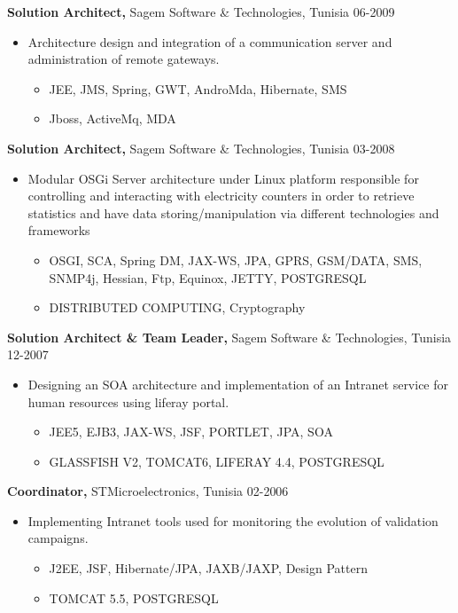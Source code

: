 \documentclass{res}
\begin{document}
\begin{resume}
{\bf Solution Architect,} Sagem Software \& Technologies, Tunisia \hfill   06-2009
\begin{itemize} \itemsep -2pt  %
\item Architecture design and integration of a communication server and administration of remote gateways.
\begin{itemize} \itemsep -2pt  %
\item JEE, JMS, Spring, GWT, AndroMda, Hibernate, SMS
\item Jboss, ActiveMq, MDA
\end{itemize}
\end{itemize}

{\bf Solution Architect,} Sagem Software \& Technologies, Tunisia \hfill   03-2008
\begin{itemize} \itemsep -2pt  %
\item Modular OSGi Server architecture under Linux platform responsible for controlling and interacting with electricity counters in order to retrieve statistics and have data storing/manipulation via different technologies and frameworks
\begin{itemize} \itemsep -2pt  %
\item OSGI, SCA, Spring DM, JAX-WS, JPA, GPRS, GSM/DATA, SMS, SNMP4j, Hessian, Ftp, Equinox, JETTY, POSTGRESQL
\item DISTRIBUTED COMPUTING, Cryptography
\end{itemize}
\end{itemize}


{\bf Solution Architect \& Team Leader,} Sagem Software \& Technologies, Tunisia \hfill   12-2007
\begin{itemize} \itemsep -2pt  %
\item Designing an SOA architecture and implementation of an Intranet service for human resources using liferay portal.
\begin{itemize} \itemsep -2pt  %
\item JEE5, EJB3, JAX-WS, JSF, PORTLET, JPA, SOA
\item GLASSFISH V2, TOMCAT6, LIFERAY 4.4, POSTGRESQL
\end{itemize}
\end{itemize}


{\bf Coordinator,} STMicroelectronics, Tunisia \hfill   02-2006
\begin{itemize} \itemsep -2pt  %
\item Implementing Intranet tools used for monitoring the evolution of validation campaigns.
\begin{itemize} \itemsep -2pt  %
\item J2EE, JSF, Hibernate/JPA, JAXB/JAXP, Design Pattern
\item TOMCAT 5.5, POSTGRESQL
\end{itemize}
\end{itemize}



\end{resume}
\end{document}
